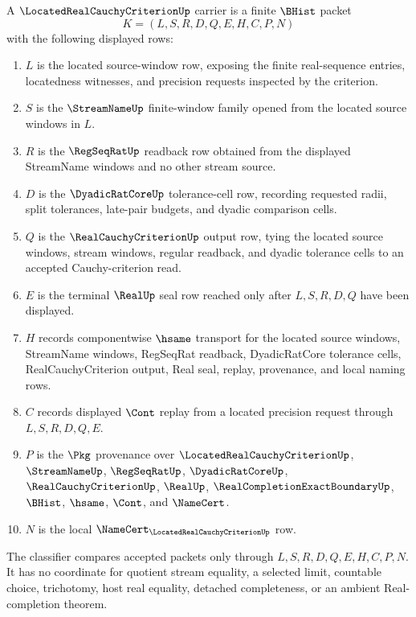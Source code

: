 \begin{definition}
\label{def:located-real-cauchy-criterion-carrier}
A $\LocatedRealCauchyCriterionUp$ carrier is a finite $\BHist$ packet
$$
K=(L,S,R,D,Q,E,H,C,P,N)
$$
with the following displayed rows:
\begin{enumerate}
\item $L$ is the located source-window row, exposing the finite real-sequence entries, locatedness witnesses, and precision requests inspected by the criterion.
\item $S$ is the $\StreamNameUp$ finite-window family opened from the located source windows in $L$.
\item $R$ is the $\RegSeqRatUp$ readback row obtained from the displayed StreamName windows and no other stream source.
\item $D$ is the $\DyadicRatCoreUp$ tolerance-cell row, recording requested radii, split tolerances, late-pair budgets, and dyadic comparison cells.
\item $Q$ is the $\RealCauchyCriterionUp$ output row, tying the located source windows, stream windows, regular readback, and dyadic tolerance cells to an accepted Cauchy-criterion read.
\item $E$ is the terminal $\RealUp$ seal row reached only after $L,S,R,D,Q$ have been displayed.
\item $H$ records componentwise $\hsame$ transport for the located source windows, StreamName windows, RegSeqRat readback, DyadicRatCore tolerance cells, RealCauchyCriterion output, Real seal, replay, provenance, and local naming rows.
\item $C$ records displayed $\Cont$ replay from a located precision request through $L,S,R,D,Q,E$.
\item $P$ is the $\Pkg$ provenance over $\LocatedRealCauchyCriterionUp$, $\StreamNameUp$, $\RegSeqRatUp$, $\DyadicRatCoreUp$, $\RealCauchyCriterionUp$, $\RealUp$, $\RealCompletionExactBoundaryUp$, $\BHist$, $\hsame$, $\Cont$, and $\NameCert$.
\item $N$ is the local $\NameCert_{\LocatedRealCauchyCriterionUp}$ row.
\end{enumerate}
The classifier compares accepted packets only through $L,S,R,D,Q,E,H,C,P,N$. It has no coordinate for quotient stream equality, a selected limit, countable choice, trichotomy, host real equality, detached completeness, or an ambient Real-completion theorem.
\end{definition}

